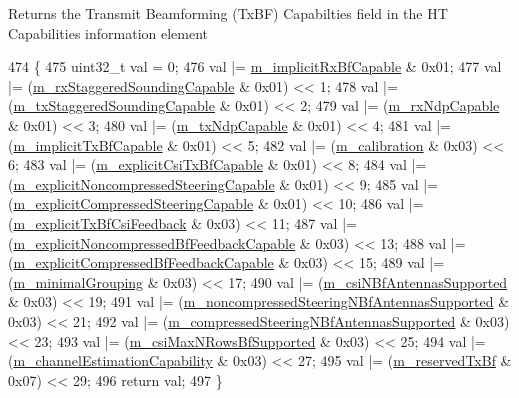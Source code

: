 \begin{DoxyReturn}{Returns}
the Transmit Beamforming (Tx\+BF) Capabilties field in the HT Capabilities information element 
\end{DoxyReturn}

\begin{DoxyCode}
474 \{
475   uint32\_t val = 0;
476   val |= \hyperlink{classns3_1_1HtCapabilities_aab2257b1ed21afbdf9461f7279d2467c}{m\_implicitRxBfCapable} & 0x01;
477   val |= (\hyperlink{classns3_1_1HtCapabilities_a2800a2c035cf78f10fc1bfb9869d8428}{m\_rxStaggeredSoundingCapable} & 0x01) << 1;
478   val |= (\hyperlink{classns3_1_1HtCapabilities_a56b848fe6b83dd90cce1bc79ab9a85a6}{m\_txStaggeredSoundingCapable} & 0x01) << 2;
479   val |= (\hyperlink{classns3_1_1HtCapabilities_a7039be4ac83036eb6b3fc100ee57fcc6}{m\_rxNdpCapable} & 0x01) << 3;
480   val |= (\hyperlink{classns3_1_1HtCapabilities_a7e186a7bc6038344488f66095e186219}{m\_txNdpCapable} & 0x01) << 4;
481   val |= (\hyperlink{classns3_1_1HtCapabilities_a607d92622d4723098cb0f94a1b470660}{m\_implicitTxBfCapable} & 0x01) << 5;
482   val |= (\hyperlink{classns3_1_1HtCapabilities_a0176690dd0f5fd9568b4a8df0f2a587f}{m\_calibration} & 0x03) << 6;
483   val |= (\hyperlink{classns3_1_1HtCapabilities_af74335c78c6c9400e3766c853dd22f7a}{m\_explicitCsiTxBfCapable} & 0x01) << 8;
484   val |= (\hyperlink{classns3_1_1HtCapabilities_aa1b4195b8cbcd9c2d1189e862cfd694b}{m\_explicitNoncompressedSteeringCapable} & 0x01) << 9;
485   val |= (\hyperlink{classns3_1_1HtCapabilities_af8798433f1b66b1d04eb752d362b7fbf}{m\_explicitCompressedSteeringCapable} & 0x01) << 10;
486   val |= (\hyperlink{classns3_1_1HtCapabilities_a6bb0b4be191cae387ee80569df6b376b}{m\_explicitTxBfCsiFeedback} & 0x03) << 11;
487   val |= (\hyperlink{classns3_1_1HtCapabilities_a938d861ca3d9167c3beff00c2664098b}{m\_explicitNoncompressedBfFeedbackCapable} & 0x03) << 13;
488   val |= (\hyperlink{classns3_1_1HtCapabilities_a1ee805003f1223d7c5bbdd74f63612c8}{m\_explicitCompressedBfFeedbackCapable} & 0x03) << 15;
489   val |= (\hyperlink{classns3_1_1HtCapabilities_a5084a740132ff1756aefc28e022e4481}{m\_minimalGrouping} & 0x03) << 17;
490   val |= (\hyperlink{classns3_1_1HtCapabilities_abd07898fcf99ad67706ba00724cd2cd6}{m\_csiNBfAntennasSupported} & 0x03) << 19;
491   val |= (\hyperlink{classns3_1_1HtCapabilities_ae7be4921a53fffad597527cc2b1fceac}{m\_noncompressedSteeringNBfAntennasSupported} & 0x03) <<
       21;
492   val |= (\hyperlink{classns3_1_1HtCapabilities_a20ab9f5b04a077d45eb8182aef0691ef}{m\_compressedSteeringNBfAntennasSupported} & 0x03) << 23;
493   val |= (\hyperlink{classns3_1_1HtCapabilities_a69916bbb030d4c5e9f434e19551bc784}{m\_csiMaxNRowsBfSupported} & 0x03) << 25;
494   val |= (\hyperlink{classns3_1_1HtCapabilities_ab3ba104365acd7bbe1e9596aaea16bbe}{m\_channelEstimationCapability} & 0x03) << 27;
495   val |= (\hyperlink{classns3_1_1HtCapabilities_a292c85ad03ad15416f0256a660e972e3}{m\_reservedTxBf} & 0x07) << 29;
496   \textcolor{keywordflow}{return} val;
497 \}
\end{DoxyCode}


